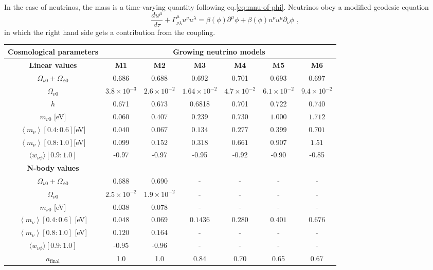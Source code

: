In the case of neutrinos, the mass is a time-varying quantity following
eq.\ref{eq:mnu-of-phi}. Neutrinos obey a modified geodesic
equation 
\begin{equation}
\frac{du^{\mu}}{d\tau}+\Gamma_{\nu\lambda}^{\mu}u^{\nu}u^{\lambda}=\beta(\phi)\partial^{\mu}\phi+\beta(\phi)u^{\nu}u^{\mu}\partial_{\nu}\phi\,\,,
\end{equation}
in which the right hand side gets a contribution from the coupling.

\begin{table}
\centering{}%
\tiny
\begin{tabular}{|c|c|c|c|c|c|c|}
\hline 
\textbf{Cosmological parameters}  & \multicolumn{6}{c|}{\textbf{Growing neutrino models}}\tabularnewline
\hline 
\textbf{{Linear values} }  & \textbf{{M1} }  & \textbf{{M2} }  & \textbf{{M3} }  & \textbf{{M4} }  & \textbf{{M5} }  & \textbf{{M6}}\tabularnewline
\hline 
\hline 
$\Omega_{\nu0}+\Omega_{\phi0}$  & 0.686  & 0.688  & 0.692  & 0.701  & 0.693  & 0.697\tabularnewline
\hline 
$\Omega_{\nu0}$  & $3.8\times10^{-3}$  & $2.6\times10^{-2}$  & $1.64\times10^{-2}$  & $4.7\times10^{-2}$  & $6.1\times10^{-2}$  & $9.4\times10^{-2}$\tabularnewline
\hline 
$h$  & 0.671  & 0.673  & 0.6818  & 0.701  & 0.722  & 0.740\tabularnewline
\hline 
$m_{\nu0}$ {[}eV{]}  & $0.060$  & $0.407$  & $0.239$  & $0.730$  & $1.000$  & $1.712$\tabularnewline
\hline 
$\left\langle m_{\nu}\right\rangle $$[0.4:0.6]${[}eV{]}  & $0.040$  & $0.067$  & $0.134$  & $0.277$  & $0.399$  & $0.701$\tabularnewline
\hline 
$\left\langle m_{\nu}\right\rangle $$[0.8:1.0]${[}eV{]}  & $0.099$  & $0.152$  & $0.318$  & $0.661$  & $0.907$  & $1.51$\tabularnewline
\hline 
$\langle w_{\nu\phi}\rangle[0.9:1.0]$  & -0.97  & -0.97  & -0.95  & -0.92  & -0.90  & -0.85\tabularnewline
\hline 
\hline 
\textbf{{N-body values} }  &  &  &  &  &  & \tabularnewline
\hline 
\hline 
$\Omega_{\nu0}+\Omega_{\phi0}$  & 0.688  & 0.690  & -  & -  & -  & -\tabularnewline
\hline 
$\Omega_{\nu0}$  & $2.5\times10^{-2}$  & $1.9\times10^{-2}$  & -  & -  & -  & -\tabularnewline
\hline 
$m_{\nu0}$ {[}eV{]}  & 0.038  & 0.078  & -  & -  & -  & -\tabularnewline
\hline 
$\left\langle m_{\nu}\right\rangle [0.4:0.6]$ {[}eV{]}  & $0.048$  & $0.069$  & $0.1436$  & $0.280$  & $0.401$  & $0.676$\tabularnewline
\hline 
$\left\langle m_{\nu}\right\rangle [0.8:1.0]$ {[}eV{]}  & $0.120$  & $0.164$  & -  & -  & -  & -\tabularnewline
\hline 
$\langle w_{\nu\phi}\rangle[0.9:1.0]$  & -0.95  & -0.96  & -  & -  & -  & -\tabularnewline
\hline 
$a_{\text{final}}$  & 1.0  & 1.0  & 0.84  & 0.70  & 0.65  & 0.67\tabularnewline

\end{tabular}
\end{table}
